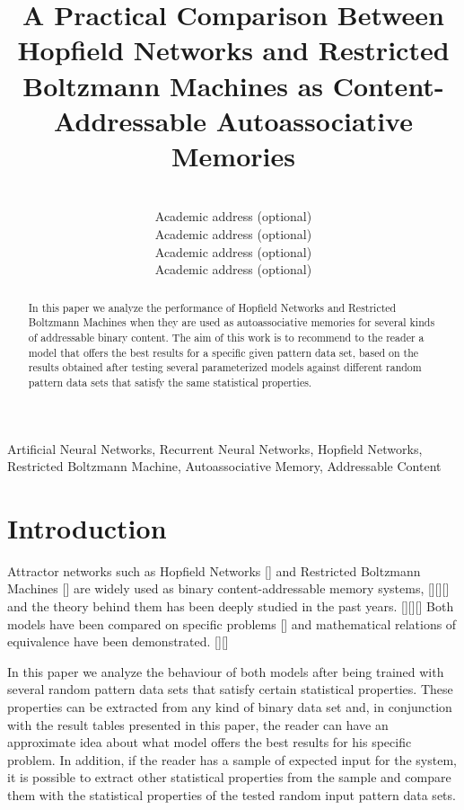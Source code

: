\documentclass[anon]{CI}
\title[My CI Project]{A Practical Comparison Between Hopfield Networks and Restricted Boltzmann Machines as Content-Addressable Autoassociative Memories}
\author{
 \Name{Javier Beltr{\'a}n} \Email{javierbeltranj@gmail.com}\\
 \addr Academic address (optional)
 \AND
 \Name{Guillermo Bern{\'e}rdez} \Email{gbg1441@gmail.com}\\
 \addr Academic address (optional)
 \AND
 \Name{Juan Lao} \Email{nitzing@gmail.com}\\
 \addr Academic address (optional)
 \AND
 \Name{Jorge Rodr{\'i}guez} \Email{j.rodriguez.molinuevo@gmail.com}\\
 \addr Academic address (optional)
 }
\begin{document}
\maketitle

\begin{abstract}
In this paper we analyze the performance of Hopfield Networks and Restricted Boltzmann Machines when they are used as autoassociative memories for several kinds of addressable binary content. The aim of this work is to recommend to the reader a model that offers the best results for a specific given pattern data set, based on the results obtained after testing several parameterized models against different random pattern data sets that satisfy the same statistical properties. 
\end{abstract}

\begin{keywords}
 Artificial Neural Networks, Recurrent Neural Networks, Hopfield Networks, Restricted Boltzmann Machine, Autoassociative Memory, Addressable Content
\end{keywords}


\section{Introduction}

Attractor networks such as Hopfield Networks [\cite{hopfield1982neural}] and Restricted Boltzmann Machines [\cite{Smolensky87}] are widely used as binary content-addressable memory systems, [\cite{DAI1998159}][\cite{SCHULZ1995145}][\cite{KrizhevskyH11}] and the theory behind them has been deeply studied in the past years. [\cite{80232}][\cite{298706}][\cite{6889573}] Both models have been compared on specific problems [\cite{552753}] and mathematical relations of equivalence have been demonstrated. [\cite{Barra20121}][\cite{Agliari201352}]

In this paper we analyze the behaviour of both models after being trained with several random pattern data sets that satisfy certain statistical properties. These properties can be extracted from any kind of binary data set and, in conjunction with the result tables presented in this paper, the reader can have an approximate idea about what model offers the best results for his specific problem. In addition, if the reader has a sample of expected input for the system, it is possible to extract other statistical properties from the sample and compare them with the statistical properties of the tested random input pattern data sets.
\end{document}
